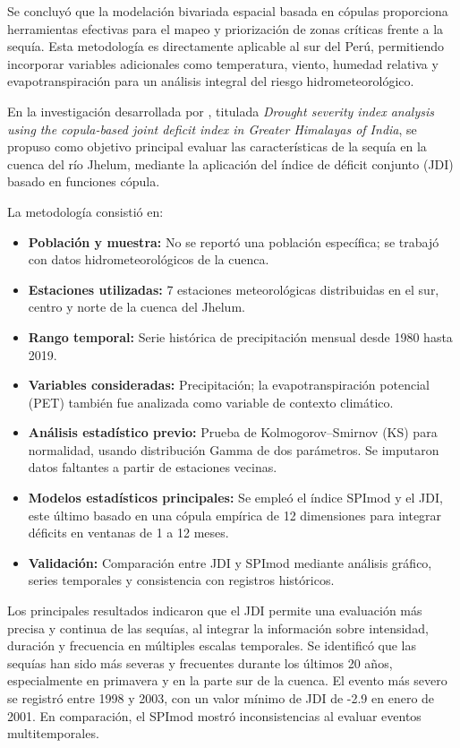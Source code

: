 Se concluyó que la modelación bivariada espacial basada en cópulas proporciona herramientas efectivas para el mapeo y priorización de zonas críticas frente a la sequía. Esta metodología es directamente aplicable al sur del Perú, permitiendo incorporar variables adicionales como temperatura, viento, humedad relativa y evapotranspiración para un análisis integral del riesgo hidrometeorológico.


En la investigación desarrollada por \textcite{Parvaze2025}, titulada \textit{Drought severity index analysis using the copula-based joint deficit index in Greater Himalayas of India}, se propuso como objetivo principal evaluar las características de la sequía en la cuenca del río Jhelum, mediante la aplicación del índice de déficit conjunto (JDI) basado en funciones cópula.

La metodología consistió en:
\begin{itemize}
  \item \textbf{Población y muestra:} No se reportó una población específica; se trabajó con datos hidrometeorológicos de la cuenca.
  \item \textbf{Estaciones utilizadas:} 7 estaciones meteorológicas distribuidas en el sur, centro y norte de la cuenca del Jhelum.
  \item \textbf{Rango temporal:} Serie histórica de precipitación mensual desde 1980 hasta 2019.
  \item \textbf{Variables consideradas:} Precipitación; la evapotranspiración potencial (PET) también fue analizada como variable de contexto climático.
  \item \textbf{Análisis estadístico previo:} Prueba de Kolmogorov–Smirnov (KS) para normalidad, usando distribución Gamma de dos parámetros. Se imputaron datos faltantes a partir de estaciones vecinas.
  \item \textbf{Modelos estadísticos principales:} Se empleó el índice SPImod y el JDI, este último basado en una cópula empírica de 12 dimensiones para integrar déficits en ventanas de 1 a 12 meses.
  \item \textbf{Validación:} Comparación entre JDI y SPImod mediante análisis gráfico, series temporales y consistencia con registros históricos.
\end{itemize}

Los principales resultados indicaron que el JDI permite una evaluación más precisa y continua de las sequías, al integrar la información sobre intensidad, duración y frecuencia en múltiples escalas temporales. Se identificó que las sequías han sido más severas y frecuentes durante los últimos 20 años, especialmente en primavera y en la parte sur de la cuenca. El evento más severo se registró entre 1998 y 2003, con un valor mínimo de JDI de -2.9 en enero de 2001. En comparación, el SPImod mostró inconsistencias al evaluar eventos multitemporales.

